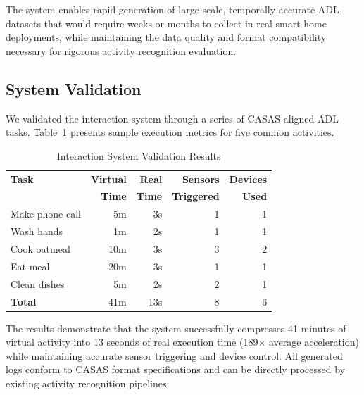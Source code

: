 \documentclass[conference]{IEEEtran}
\begin{document}
The system enables rapid generation of large-scale, temporally-accurate ADL datasets that would require weeks or months to collect in real smart home deployments, while maintaining the data quality and format compatibility necessary for rigorous activity recognition evaluation.


\subsection{System Validation}

We validated the interaction system through a series of CASAS-aligned ADL tasks. Table~\ref{tab:validation_results} presents sample execution metrics for five common activities.

\begin{table}[t]
\centering
\caption{Interaction System Validation Results}
\label{tab:validation_results}
\begin{tabular}{@{}lrrrr@{}}
\toprule
\textbf{Task} & \textbf{Virtual} & \textbf{Real} & \textbf{Sensors} & \textbf{Devices} \\
& \textbf{Time} & \textbf{Time} & \textbf{Triggered} & \textbf{Used} \\
\midrule
Make phone call & 5m & 3s & 1 & 1 \\
Wash hands & 1m & 2s & 1 & 1 \\
Cook oatmeal & 10m & 3s & 3 & 2 \\
Eat meal & 20m & 3s & 1 & 1 \\
Clean dishes & 5m & 2s & 2 & 1 \\
\midrule
\textbf{Total} & 41m & 13s & 8 & 6 \\
\bottomrule
\end{tabular}
\end{table}

The results demonstrate that the system successfully compresses 41 minutes of virtual activity into 13 seconds of real execution time (189$\times$ average acceleration) while maintaining accurate sensor triggering and device control. All generated logs conform to CASAS format specifications and can be directly processed by existing activity recognition pipelines.


\end{document}
